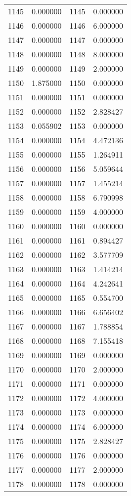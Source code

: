 \documentclass[12pt]{article}
\begin{document}
\begin{longtable}{@{}cccc@{}}
1145 & 0.000000 & 1145 & 0.000000 \\
1146 & 0.000000 & 1146 & 6.000000 \\
1147 & 0.000000 & 1147 & 0.000000 \\
1148 & 0.000000 & 1148 & 8.000000 \\
1149 & 0.000000 & 1149 & 2.000000 \\
1150 & 1.875000 & 1150 & 0.000000 \\
1151 & 0.000000 & 1151 & 0.000000 \\
1152 & 0.000000 & 1152 & 2.828427 \\
1153 & 0.055902 & 1153 & 0.000000 \\
1154 & 0.000000 & 1154 & 4.472136 \\
1155 & 0.000000 & 1155 & 1.264911 \\
1156 & 0.000000 & 1156 & 5.059644 \\
1157 & 0.000000 & 1157 & 1.455214 \\
1158 & 0.000000 & 1158 & 6.790998 \\
1159 & 0.000000 & 1159 & 4.000000 \\
1160 & 0.000000 & 1160 & 0.000000 \\
1161 & 0.000000 & 1161 & 0.894427 \\
1162 & 0.000000 & 1162 & 3.577709 \\
1163 & 0.000000 & 1163 & 1.414214 \\
1164 & 0.000000 & 1164 & 4.242641 \\
1165 & 0.000000 & 1165 & 0.554700 \\
1166 & 0.000000 & 1166 & 6.656402 \\
1167 & 0.000000 & 1167 & 1.788854 \\
1168 & 0.000000 & 1168 & 7.155418 \\
1169 & 0.000000 & 1169 & 0.000000 \\
1170 & 0.000000 & 1170 & 2.000000 \\
1171 & 0.000000 & 1171 & 0.000000 \\
1172 & 0.000000 & 1172 & 4.000000 \\
1173 & 0.000000 & 1173 & 0.000000 \\
1174 & 0.000000 & 1174 & 6.000000 \\
1175 & 0.000000 & 1175 & 2.828427 \\
1176 & 0.000000 & 1176 & 0.000000 \\
1177 & 0.000000 & 1177 & 2.000000 \\
1178 & 0.000000 & 1178 & 0.000000 \\

\end{longtable}
\end{document}
